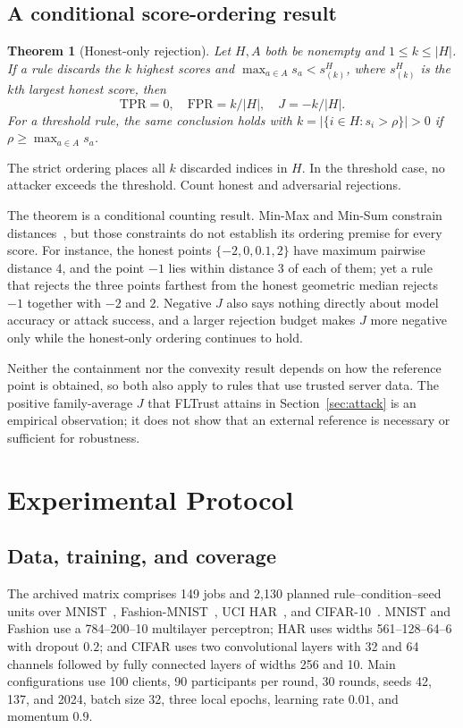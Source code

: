 \documentclass[journal]{IEEEtran}
\newtheorem{theorem}{Theorem}
\begin{document}
\subsection{A conditional score-ordering result}
\begin{theorem}[Honest-only rejection]\label{thm:inversion}
Let $H,A$ both be nonempty and $1\leq k\leq|H|$. If a rule discards the $k$ highest scores and $\max_{a\in A}s_a<s^H_{(k)}$, where $s^H_{(k)}$ is the $k$th largest honest score, then
\[
\mathrm{TPR}=0,\quad\mathrm{FPR}=k/|H|,\quad J=-k/|H|.
\]
For a threshold rule, the same conclusion holds with $k=|\{i\in H:s_i>\rho\}|>0$ if $\rho\geq\max_{a\in A}s_a$.
\end{theorem}
\begin{IEEEproof}
The strict ordering places all $k$ discarded indices in $H$. In the threshold case, no attacker exceeds the threshold. Count honest and adversarial rejections.
\end{IEEEproof}
The theorem is a conditional counting result. Min-Max and Min-Sum constrain distances~\cite{shejwalkar2021}, but those constraints do not establish its ordering premise for every score. For instance, the honest points $\{-2,0,0.1,2\}$ have maximum pairwise distance 4, and the point $-1$ lies within distance 3 of each of them; yet a rule that rejects the three points farthest from the honest geometric median rejects $-1$ together with $-2$ and $2$. Negative $J$ also says nothing directly about model accuracy or attack success, and a larger rejection budget makes $J$ more negative only while the honest-only ordering continues to hold.

Neither the containment nor the convexity result depends on how the reference point is obtained, so both also apply to rules that use trusted server data. The positive family-average $J$ that FLTrust attains in Section~\ref{sec:attack} is an empirical observation; it does not show that an external reference is necessary or sufficient for robustness.

\section{Experimental Protocol}\label{sec:protocol}


\subsection{Data, training, and coverage}
The archived matrix comprises 149 jobs and 2{,}130 planned rule--condition--seed units over MNIST~\cite{lecun1998}, Fashion-MNIST~\cite{xiao2017fmnist}, UCI HAR~\cite{anguita2013har}, and CIFAR-10~\cite{krizhevsky2009}. MNIST and Fashion use a 784--200--10 multilayer perceptron; HAR uses widths 561--128--64--6 with dropout $0.2$; and CIFAR uses two convolutional layers with 32 and 64 channels followed by fully connected layers of widths 256 and 10. Main configurations use 100 clients, 90 participants per round, 30 rounds, seeds 42, 137, and 2024, batch size 32, three local epochs, learning rate $0.01$, and momentum $0.9$.
\end{document}
